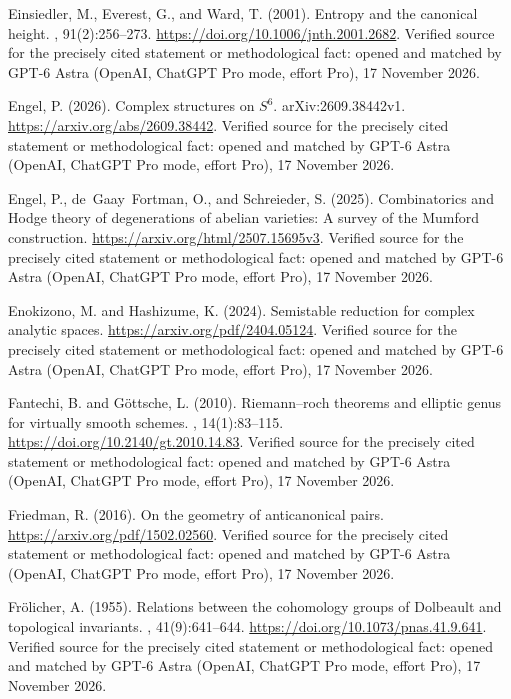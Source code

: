 \begin{thebibliography}{}
Einsiedler, M., Everest, G., and Ward, T. (2001).
\newblock Entropy and the canonical height.
, 91(2):256--273.
\newblock \url{https://doi.org/10.1006/jnth.2001.2682}. Verified source for the precisely cited statement or methodological fact: opened and matched by GPT-6 Astra (OpenAI, ChatGPT Pro mode, effort Pro), 17 November 2026.

Engel, P. (2026).
\newblock Complex structures on {$S^6$}.
\newblock arXiv:2609.38442v1.
\newblock \url{https://arxiv.org/abs/2609.38442}. Verified source for the precisely cited statement or methodological fact: opened and matched by GPT-6 Astra (OpenAI, ChatGPT Pro mode, effort Pro), 17 November 2026.

Engel, P., de~Gaay~Fortman, O., and Schreieder, S. (2025).
\newblock Combinatorics and {H}odge theory of degenerations of abelian
  varieties: A survey of the {M}umford construction.
\newblock \url{https://arxiv.org/html/2507.15695v3}. Verified source for the precisely cited statement or methodological fact: opened and matched by GPT-6 Astra (OpenAI, ChatGPT Pro mode, effort Pro), 17 November 2026.

Enokizono, M. and Hashizume, K. (2024).
\newblock Semistable reduction for complex analytic spaces.
\newblock \url{https://arxiv.org/pdf/2404.05124}. Verified source for the precisely cited statement or methodological fact: opened and matched by GPT-6 Astra (OpenAI, ChatGPT Pro mode, effort Pro), 17 November 2026.

Fantechi, B. and G{\"o}ttsche, L. (2010).
\newblock Riemann--roch theorems and elliptic genus for virtually smooth
  schemes.
, 14(1):83--115.
\newblock \url{https://doi.org/10.2140/gt.2010.14.83}. Verified source for the precisely cited statement or methodological fact: opened and matched by GPT-6 Astra (OpenAI, ChatGPT Pro mode, effort Pro), 17 November 2026.

Friedman, R. (2016).
\newblock On the geometry of anticanonical pairs.
\newblock \url{https://arxiv.org/pdf/1502.02560}. Verified source for the precisely cited statement or methodological fact: opened and matched by GPT-6 Astra (OpenAI, ChatGPT Pro mode, effort Pro), 17 November 2026.

Fr{\"o}licher, A. (1955).
\newblock Relations between the cohomology groups of {Dolbeault} and
  topological invariants.
, 41(9):641--644.
\newblock \url{https://doi.org/10.1073/pnas.41.9.641}. Verified source for the precisely cited statement or methodological fact: opened and matched by GPT-6 Astra (OpenAI, ChatGPT Pro mode, effort Pro), 17 November 2026.


\end{thebibliography}
